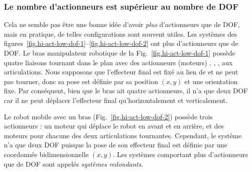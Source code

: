 \subsubsection*{Le nombre d'actionneurs est supérieur au nombre de DOF}

Cela ne semble pas être une bonne idée d'avoir \emph{plus} d'actionneurs que de DOF, mais en pratique, de telles configurations sont souvent utiles. Les systèmes des figures~\ref{fig.hi-act-low-dof-1}--\ref{fig.hi-act-low-dof-2} ont plus d'actionneurs que de DOF. Le bras manipulateur robotique de la Fig.~\ref{fig.hi-act-low-dof-1} possède quatre liaisons tournant dans le plan avec des actionneurs (moteurs) , , ,  aux articulations. Nous supposons que l'effecteur final est fixé au lien de  et ne peut pas tourner, donc sa pose est définie par sa position $(x,y)$ et une orientation fixe. Par conséquent, bien que le bras ait quatre actionneurs, il n'a que deux DOF car il ne peut déplacer l'effecteur final qu'horizontalement et verticalement.

Le robot mobile avec un bras (Fig.~\ref{fig.hi-act-low-dof-2}) possède trois actionneurs : un moteur qui déplace le robot en avant et en arrière, et des moteurs pour chacune des deux articulations tournantes. Cependant, le système n'a que deux DOF puisque la pose de son effecteur final est définie par une coordonnée bidimensionnelle $(x,y)$. Les systèmes comportant plus d'actionneurs que de DOF sont appelés \emph{systèmes redondants}.

